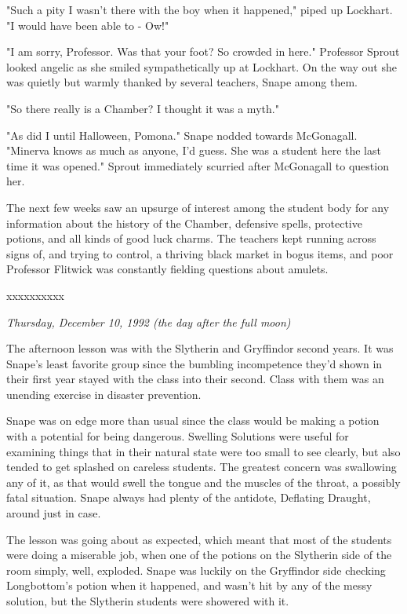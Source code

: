 \documentclass[a4paper,11pt]{article}
\begin{document}
"Such a pity I wasn't there with the boy when it happened," piped up Lockhart. "I would have been able to - Ow!"

"I am sorry, Professor. Was that your foot? So crowded in here." Professor Sprout looked angelic as she smiled sympathetically up at Lockhart. On the way out she was quietly but warmly thanked by several teachers, Snape among them.

"So there really is a Chamber? I thought it was a myth."

"As did I until Halloween, Pomona." Snape nodded towards McGonagall. "Minerva knows as much as anyone, I'd guess. She was a student here the last time it was opened." Sprout immediately scurried after McGonagall to question her.

The next few weeks saw an upsurge of interest among the student body for any information about the history of the Chamber, defensive spells, protective potions, and all kinds of good luck charms. The teachers kept running across signs of, and trying to control, a thriving black market in bogus items, and poor Professor Flitwick was constantly fielding questions about amulets.

xxxxxxxxxx

\emph{Thursday, December 10, 1992 (the day after the full moon)}

The afternoon lesson was with the Slytherin and Gryffindor second years. It was Snape's least favorite group since the bumbling incompetence they'd shown in their first year stayed with the class into their second. Class with them was an unending exercise in disaster prevention.

Snape was on edge more than usual since the class would be making a potion with a potential for being dangerous. Swelling Solutions were useful for examining things that in their natural state were too small to see clearly, but also tended to get splashed on careless students. The greatest concern was swallowing any of it, as that would swell the tongue and the muscles of the throat, a possibly fatal situation. Snape always had plenty of the antidote, Deflating Draught, around just in case.

The lesson was going about as expected, which meant that most of the students were doing a miserable job, when one of the potions on the Slytherin side of the room simply, well, exploded. Snape was luckily on the Gryffindor side checking Longbottom's potion when it happened, and wasn't hit by any of the messy solution, but the Slytherin students were showered with it.
\end{document}
